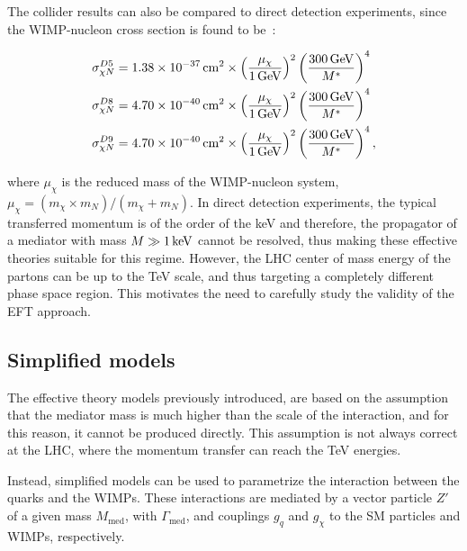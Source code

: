 The collider results can also be compared to direct detection experiments, since the WIMP-nucleon cross section is found to be~\cite{Goodman:2010ku}:

\begin{equation}
\begin{split}
\sigma^{D5}_{\chi N} &= 1.38 \times \unit[10^{-37}]{cm^2} \times \left(\frac{\mu_{\chi}}{\unit[1]{GeV}}\right)^2\left(\frac{\unit[300]{GeV}}{M^{\ast}}\right)^4 \\
\sigma^{D8}_{\chi N} &= 4.70 \times \unit[10^{-40}]{cm^2} \times \left(\frac{\mu_{\chi}}{\unit[1]{GeV}}\right)^2\left(\frac{\unit[300]{GeV}}{M^{\ast}}\right)^4 \\
\sigma^{D9}_{\chi N} &= 4.70 \times \unit[10^{-40}]{cm^2} \times \left(\frac{\mu_{\chi}}{\unit[1]{GeV}}\right)^2\left(\frac{\unit[300]{GeV}}{M^{\ast}}\right)^4, \\
\end{split}
\label{eq:WIMP-Nucleon}
\end{equation}

\noindent where $\mu_{\chi}$ is the reduced mass of the WIMP-nucleon system, $\mu_{\chi} = (m_{\chi} \times m_N) / (m_{\chi} + m_N)$.
In direct detection experiments, the typical transferred momentum is of the order of the keV and therefore, the propagator of a mediator with mass $M \gg \unit[1]{keV}$ cannot be resolved, thus making these effective theories suitable for this regime.
However, the LHC center of mass energy of the partons can be up to the TeV scale, and thus targeting a completely different phase space region.
This motivates the need to carefully study the validity of the EFT approach.


\subsection{Simplified models}
    \label{subsubsec:simplifiedModels}

The effective theory models previously introduced, are based on the assumption that the mediator mass is much higher than the scale of the interaction, and for this reason, it cannot be produced directly.
This assumption is not always correct at the LHC, where the momentum transfer can reach the TeV energies.

Instead, simplified models can be used to parametrize the interaction between the quarks and the WIMPs.
These interactions are mediated by a vector particle $Z'$ of a given mass $M_{\text{med}}$, with $\Gamma_{\text{med}}$, and couplings $g_{q}$ and $g_{\chi}$ to the SM particles and WIMPs, respectively.
